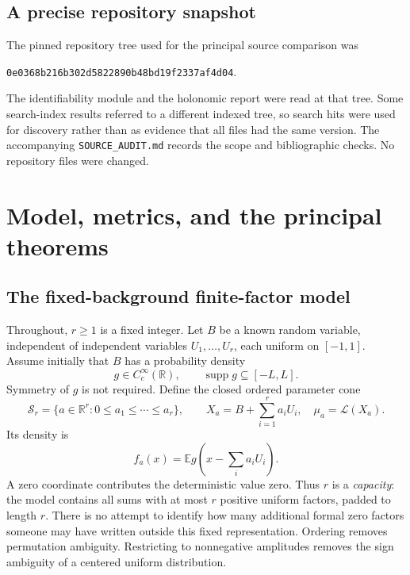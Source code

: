 \documentclass[11pt,a4paper]{article}
\numberwithin{equation}{section}
\theoremstyle{definition}
\theoremstyle{remark}
\newcommand{\R}{\mathbb R}
\newcommand{\E}{\mathbb E}
\newcommand{\Law}{\mathcal L}
\newcommand{\supp}{\operatorname{supp}}
\newcommand{\sr}{\mathcal S_r}
\begin{document}
\subsection{A precise repository snapshot}
The pinned repository tree used for the principal source comparison was
\begin{center}
\small\texttt{0e0368b216b302d5822890b48bd19f2337af4d04}.
\end{center}
The identifiability module and the holonomic report were read at that tree.
Some search-index results referred to a different indexed tree, so search
hits were used for discovery rather than as evidence that all files had the
same version.  The accompanying \texttt{SOURCE\_AUDIT.md} records the scope and
bibliographic checks.  No repository files were changed.

\section{Model, metrics, and the principal theorems}
\label{sec:main}

\subsection{The fixed-background finite-factor model}
Throughout, $r\ge1$ is a fixed integer.  Let $B$ be a known random variable,
independent of independent variables $U_1,\ldots,U_r$, each uniform on $[-1,1]$.
Assume initially that $B$ has a probability density
\begin{equation}
 g\in C_c^\infty(\R),\qquad \supp g\subseteq[-L,L].
 \label{eq:background}
\end{equation}
Symmetry of $g$ is not required.  Define the closed ordered parameter cone
\begin{equation}
 \sr=\{a\in\R^r:0\le a_1\le\cdots\le a_r\},\qquad
 X_a=B+\sum_{i=1}^r a_iU_i,
 \quad \mu_a=\Law(X_a).
 \label{eq:model}
\end{equation}
Its density is
\begin{equation}
 f_a(x)=\E g\left(x-\sum_i a_iU_i\right).
 \label{eq:density}
\end{equation}
A zero coordinate contributes the deterministic value zero.  Thus $r$ is a
\emph{capacity}: the model contains all sums with at most $r$ positive uniform
factors, padded to length $r$.  There is no attempt to identify how many additional
formal zero factors someone may have written outside this fixed representation.
Ordering removes permutation ambiguity.  Restricting to nonnegative amplitudes
removes the sign ambiguity of a centered uniform distribution.
\end{document}

